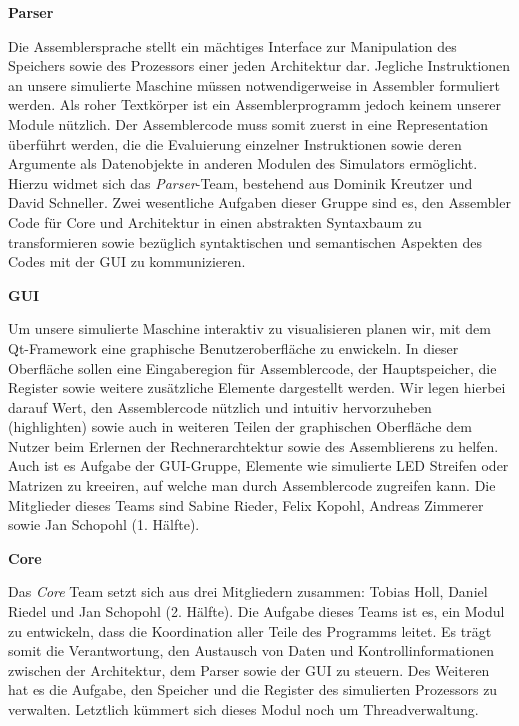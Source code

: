 \textbf{Parser}

Die Assemblersprache stellt ein mächtiges Interface zur Manipulation des
Speichers sowie des Prozessors einer jeden Architektur dar. Jegliche
Instruktionen an unsere simulierte Maschine müssen notwendigerweise in Assembler
formuliert werden. Als roher Textkörper ist ein Assemblerprogramm jedoch keinem
unserer Module nützlich. Der Assemblercode muss somit zuerst in eine
Representation überführt werden, die die Evaluierung einzelner Instruktionen
sowie deren Argumente als Datenobjekte in anderen Modulen des Simulators
ermöglicht. Hierzu widmet sich das \emph{Parser}-Team, bestehend aus Dominik
Kreutzer und David Schneller. Zwei wesentliche Aufgaben dieser Gruppe sind es,
den Assembler Code für Core und Architektur in einen abstrakten Syntaxbaum zu
transformieren sowie bezüglich syntaktischen und semantischen Aspekten des Codes
mit der GUI zu kommunizieren.

\textbf{GUI}

Um unsere simulierte Maschine interaktiv zu visualisieren planen wir, mit dem
Qt-Framework eine graphische Benutzeroberfläche zu enwickeln. In dieser
Oberfläche sollen eine Eingaberegion für Assemblercode, der Hauptspeicher, die
Register sowie weitere zusätzliche Elemente dargestellt werden. Wir legen
hierbei darauf Wert, den Assemblercode nützlich und intuitiv hervorzuheben
(highlighten) sowie auch in weiteren Teilen der graphischen Oberfläche dem
Nutzer beim Erlernen der Rechnerarchtektur sowie des Assemblierens zu
helfen. Auch ist es Aufgabe der GUI-Gruppe, Elemente wie simulierte LED Streifen
oder Matrizen zu kreeiren, auf welche man durch Assemblercode zugreifen
kann. Die Mitglieder dieses Teams sind Sabine Rieder, Felix Kopohl, Andreas
Zimmerer sowie Jan Schopohl (1. Hälfte).

\textbf{Core}

Das \emph{Core} Team setzt sich aus drei Mitgliedern zusammen: Tobias Holl,
Daniel Riedel und Jan Schopohl (2. Hälfte). Die Aufgabe dieses Teams ist es, ein
Modul zu entwickeln, dass die Koordination aller Teile des Programms leitet. Es
trägt somit die Verantwortung, den Austausch von Daten und Kontrollinformationen
zwischen der Architektur, dem Parser sowie der GUI zu steuern. Des Weiteren hat
es die Aufgabe, den Speicher und die Register des simulierten Prozessors zu
verwalten. Letztlich kümmert sich dieses Modul noch um Threadverwaltung.
